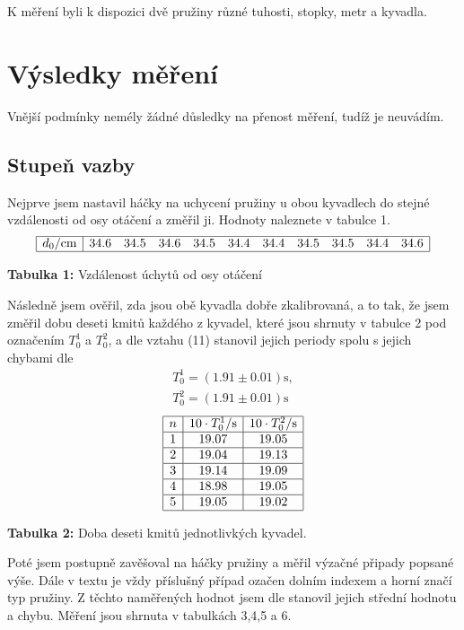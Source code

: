 \documentclass[a4paper,12pt]{article}
\begin{document}
K měření byli k dispozici dvě pružiny různé tuhosti, stopky, metr a kyvadla. 

\section{Výsledky měření}
\noindent
Vnější podmínky nemély žádné důsledky na přenost měření, tudíž je neuvádím.

\subsection{Stupeň vazby}
\noindent
Nejprve jsem nastavil háčky na uchycení pružiny u obou kyvadlech do stejné vzdálenosti od osy otáčení a změřil ji. Hodnoty naleznete v tabulce 1.
$$
\begin{array}{|l|cccccccccc|}
\hline
	d_0/\mbox{cm} &34.6&34.5&34.6&34.5&34.4&34.4&34.5& 34.5& 34.4& 34.6\\ \hline
\end{array}
$$
\begin{center}
	\textbf{Tabulka 1:} Vzdálenost úchytů od osy otáčení
\end{center} 
Následně jsem ověřil, zda jsou obě kyvadla dobře zkalibrovaná, a to tak, že jsem změřil dobu deseti kmitů každého z kyvadel, které jsou shrnuty v tabulce 2 pod označením $T_0^1$ a $T_0^2$, a dle vztahu (11) stanovil jejich periody spolu s jejich chybami dle \cite{4}
\begin{eqnarray}
T_0^1=(1.91\pm 0.01)\mbox{s}, \\
T_0^2=(1.91\pm 0.01)\mbox{s}
\end{eqnarray}
\begin{displaymath}
\begin{array}{|c|c|c|}
\hline
	n&10\cdot T_0^1/\mbox{s} & 10\cdot T_0^2/\mbox{s} \\ \hline
	1 & 19.07 &19.05 \\ \hline
	2 & 19.04 & 19.13 \\ \hline
	3 & 19.14 & 19.09 \\ \hline
	4 & 18.98 & 19.05 \\ \hline
	5 & 19.05 & 19.02 \\ \hline
\end{array}
\end{displaymath}
\begin{center}
	\textbf{Tabulka 2:} Doba deseti kmitů jednotlivkých kyvadel.
\end{center}

Poté jsem postupně zavěšoval na háčky pružiny a měřil výzačné připady popsané výše. Dále v textu je vždy příslušný případ ozačen dolním indexem a horní značí typ pružiny. Z těchto naměřených hodnot jsem dle \cite{4} stanovil jejich střední hodnotu a chybu. Měření jsou shrnuta v tabulkách 3,4,5 a 6.
\end{document}
